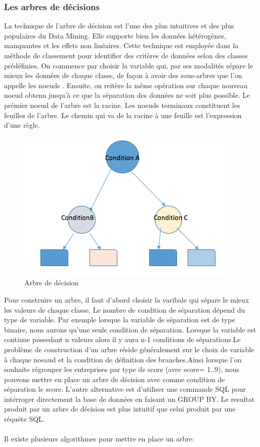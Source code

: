 \documentclass[11pt,a4paper]{report}
\begin{document}
\subsubsection{Les arbres de décisions}
La technique de l'arbre de décision est l'une des plus intuitives et des plus populaires du Data Mining. Elle supporte bien les données hétérogènes, manquantes et les effets non linéaires. Cette technique est employée dans la méthode de classement pour identifier des critères de données selon des classes prédéfinies. On commence par choisir la variable qui, par ses modalités sépare le mieux les données de chaque classe, de façon à avoir des sous-arbres que l'on appelle les noeuds \cite{stephane}. Ensuite, on reitère la même opération sur chaque nouveau noeud obtenu jusqu'à ce que la séparation des données ne soit plus possible. Le prémier noeud de l'arbre est la racine. Les noeuds terminaux constituent les feuilles de l'arbre. Le chemin qui va de la racine à une feuille est l'expression d'une règle. 
 \begin{figure}[h]
   \centering
   \includegraphics[scale=0.80]{arbre.png}
     \caption{Arbre de décision}
\end{figure}

Pour construire un arbre, il faut d'abord choisir la varibale qui sépare le mieux les valeurs de chaque classe. Le nombre de condition de séparation dépend du type de variable. Par exemple lorsque la variable de séparation est de type binaire, nous aurons qu'une seule condition de séparation. Lorsque la variable est continue possedant n valeurs alors il y aura n-1 conditions de séparations.Le problème de construction d'un arbre réside généralement sur le choix de variable à chaque noeaud et la condition de définition des branches.Ainsi lorsque l'on souhaite régrouper les entreprises par type de score (avec score= 1..9),  nous pouvons mettre en place un arbre de décision avec comme condition de séparation le score. L'autre alternative est d'utiliser une commande SQL pour intérroger directement la base de données en faisant un GROUP BY. Le resultat produit par un arbre de décision est plus intuitif que celui produit par une réquête SQL.\\\\
 Il existe plusieurs algorithmes pour mettre en place un arbre: 
\end{document}
